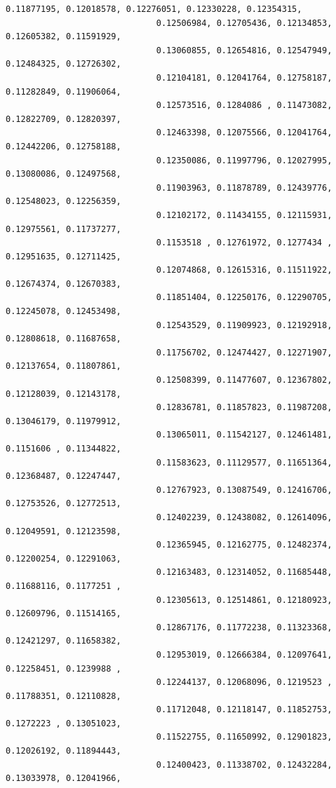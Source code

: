 \documentclass[11pt]{article}
\begin{document}
\begin{Verbatim}[commandchars=\\\{\}]
                              0.11877195, 0.12018578, 0.12276051, 0.12330228, 0.12354315,
                              0.12506984, 0.12705436, 0.12134853, 0.12605382, 0.11591929,
                              0.13060855, 0.12654816, 0.12547949, 0.12484325, 0.12726302,
                              0.12104181, 0.12041764, 0.12758187, 0.11282849, 0.11906064,
                              0.12573516, 0.1284086 , 0.11473082, 0.12822709, 0.12820397,
                              0.12463398, 0.12075566, 0.12041764, 0.12442206, 0.12758188,
                              0.12350086, 0.11997796, 0.12027995, 0.13080086, 0.12497568,
                              0.11903963, 0.11878789, 0.12439776, 0.12548023, 0.12256359,
                              0.12102172, 0.11434155, 0.12115931, 0.12975561, 0.11737277,
                              0.1153518 , 0.12761972, 0.1277434 , 0.12951635, 0.12711425,
                              0.12074868, 0.12615316, 0.11511922, 0.12674374, 0.12670383,
                              0.11851404, 0.12250176, 0.12290705, 0.12245078, 0.12453498,
                              0.12543529, 0.11909923, 0.12192918, 0.12808618, 0.11687658,
                              0.11756702, 0.12474427, 0.12271907, 0.12137654, 0.11807861,
                              0.12508399, 0.11477607, 0.12367802, 0.12128039, 0.12143178,
                              0.12836781, 0.11857823, 0.11987208, 0.13046179, 0.11979912,
                              0.13065011, 0.11542127, 0.12461481, 0.1151606 , 0.11344822,
                              0.11583623, 0.11129577, 0.11651364, 0.12368487, 0.12247447,
                              0.12767923, 0.13087549, 0.12416706, 0.12753526, 0.12772513,
                              0.12402239, 0.12438082, 0.12614096, 0.12049591, 0.12123598,
                              0.12365945, 0.12162775, 0.12482374, 0.12200254, 0.12291063,
                              0.12163483, 0.12314052, 0.11685448, 0.11688116, 0.1177251 ,
                              0.12305613, 0.12514861, 0.12180923, 0.12609796, 0.11514165,
                              0.12867176, 0.11772238, 0.11323368, 0.12421297, 0.11658382,
                              0.12953019, 0.12666384, 0.12097641, 0.12258451, 0.1239988 ,
                              0.12244137, 0.12068096, 0.1219523 , 0.11788351, 0.12110828,
                              0.11712048, 0.12118147, 0.11852753, 0.1272223 , 0.13051023,
                              0.11522755, 0.11650992, 0.12901823, 0.12026192, 0.11894443,
                              0.12400423, 0.11338702, 0.12432284, 0.13033978, 0.12041966,

\end{Verbatim}
\end{document}
